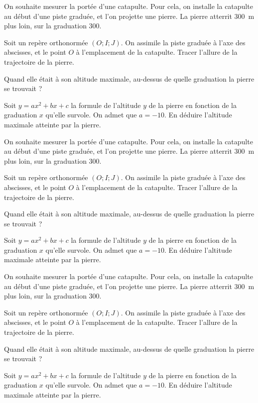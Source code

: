 \documentclass{exos}
\begin{document}
On souhaite mesurer la portée d'une catapulte. Pour cela, on installe la catapulte au début d'une piste graduée, et l'on projette une pierre. La pierre atterrit \qty{300}{\meter} plus loin, sur la graduation \num{300}.

\begin{alphaquestions}
\item Soit un repère orthonormée $(O;I;J)$. On assimile la piste graduée à l'axe des abscisses, et le point $O$ à l'emplacement de la catapulte. Tracer l'allure de la trajectoire de la pierre.
\item Quand elle était à son altitude maximale, au-dessus de quelle graduation la pierre se trouvait ?
\item Soit $y = ax^2 + bx + c$ la formule de l'altitude $y$ de la pierre en fonction de la graduation $x$ qu'elle survole. On admet que $a = -10$. En déduire l'altitude maximale atteinte par la pierre.
\end{alphaquestions}

\vspace*{2cm}
On souhaite mesurer la portée d'une catapulte. Pour cela, on installe la catapulte au début d'une piste graduée, et l'on projette une pierre. La pierre atterrit \qty{300}{\meter} plus loin, sur la graduation \num{300}.

\begin{alphaquestions}
\item Soit un repère orthonormée $(O;I;J)$. On assimile la piste graduée à l'axe des abscisses, et le point $O$ à l'emplacement de la catapulte. Tracer l'allure de la trajectoire de la pierre.
\item Quand elle était à son altitude maximale, au-dessus de quelle graduation la pierre se trouvait ?
\item Soit $y = ax^2 + bx + c$ la formule de l'altitude $y$ de la pierre en fonction de la graduation $x$ qu'elle survole. On admet que $a = -10$. En déduire l'altitude maximale atteinte par la pierre.
\end{alphaquestions}

\vspace*{2cm}
On souhaite mesurer la portée d'une catapulte. Pour cela, on installe la catapulte au début d'une piste graduée, et l'on projette une pierre. La pierre atterrit \qty{300}{\meter} plus loin, sur la graduation \num{300}.

\begin{alphaquestions}
\item Soit un repère orthonormée $(O;I;J)$. On assimile la piste graduée à l'axe des abscisses, et le point $O$ à l'emplacement de la catapulte. Tracer l'allure de la trajectoire de la pierre.
\item Quand elle était à son altitude maximale, au-dessus de quelle graduation la pierre se trouvait ?
\item Soit $y = ax^2 + bx + c$ la formule de l'altitude $y$ de la pierre en fonction de la graduation $x$ qu'elle survole. On admet que $a = -10$. En déduire l'altitude maximale atteinte par la pierre.
\end{alphaquestions}

\vspace*{2cm}
\end{document}
